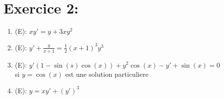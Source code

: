 \documentclass[a4paper,12pt]{article}
\begin{document}

\section*{Exercice 2:}
\begin{enumerate}
	\item (E): $xy' = y + 3xy^2$
	
	\item (E): $y' + \frac{y}{x+1} = \frac{1}{2} (x+1)^3 y^3$ \\
	
	
	\item (E): $y' (1 -\sin(s)\cos(x)) + y^2\cos(x) -y' + \sin(x) = 0$ \\ si $y = \cos(x)$ est une solution particuliere
	
	\item (E): $y = xy' + (y')^3$
\end{enumerate}
\end{document}
